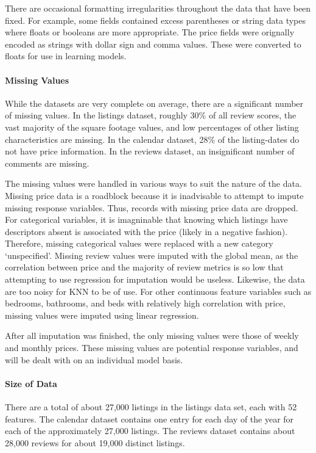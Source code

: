 \documentclass[11pt]{article}
\begin{document}
There are occasional formatting irregularities throughout the data that
have been fixed. For example, some fields contained excess parentheses
or string data types where floats or booleans are more appropriate. The
price fields were orignally encoded as strings with dollar sign and
comma values. These were converted to floats for use in learning models.

\paragraph{Missing Values}\label{missing-values}

While the datasets are very complete on average, there are a significant
number of missing values. In the listings dataset, roughly 30\% of all
review scores, the vast majority of the square footage values, and low
percentages of other listing characteristics are missing. In the
calendar dataset, 28\% of the listing-dates do not have price
information. In the reviews dataset, an insignificant number of comments
are missing.

The missing values were handled in various ways to suit the nature of
the data. Missing price data is a roadblock because it is inadvisable to
attempt to impute missing response variables. Thus, records with missing
price data are dropped. For categorical variables, it is imagninable
that knowing which listings have descriptors absent is associated with
the price (likely in a negative fashion). Therefore, missing categorical
values were replaced with a new category `unspecified'. Missing review
values were imputed with the global mean, as the correlation between
price and the majority of review metrics is so low that attempting to
use regression for imputation would be useless. Likewise, the data are
too noisy for KNN to be of use. For other continuous feature variables
such as bedrooms, bathrooms, and beds with relatively high correlation
with price, missing values were imputed using linear regression.

After all imputation was finished, the only missing values were those of
weekly and monthly prices. These missing values are potential response
variables, and will be dealt with on an individual model basis.

\paragraph{Size of Data}\label{size-of-data}

There are a total of about 27,000 listings in the listings data set,
each with 52 features. The calendar dataset contains one entry for each
day of the year for each of the approximately 27,000 listings. The
reviews dataset contains about 28,000 reviews for about 19,000 distinct
listings.
\end{document}
